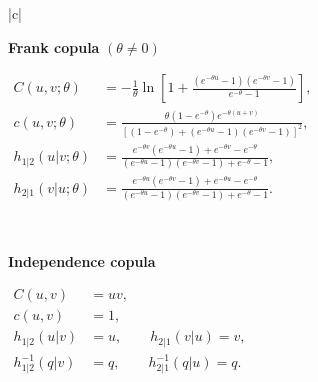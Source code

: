 \documentclass[12pt,oneside,a4paper]{book}
\theoremstyle{definition}
\theoremstyle{remark}
\begin{document}
\begin{table}[H]
\begin{tabular}{|c|}
				\\
				\hline


				\textbf{Frank copula}
				$\left(\theta\neq0\right)$
				\\
				\hline

				\(\begin{aligned}
					C(u,v;\theta)
					&=
					-\frac{1}{\theta}
					\ln\left[
					1+
					\frac{
						(e^{-\theta u}-1)
						(e^{-\theta v}-1)
					}{
						e^{-\theta}-1
					}
					\right],\\[2pt]
					c(u,v;\theta)
					&=
					\frac{
						\theta(1-e^{-\theta})
						e^{-\theta(u+v)}
					}{
						\left[
						(1-e^{-\theta})
						+
						(e^{-\theta u}-1)
						(e^{-\theta v}-1)
						\right]^2
					},\\[2pt]
					h_{1|2}(u|v;\theta)
					&=
					\frac{
						e^{-\theta v}
						(e^{-\theta u}-1)
						+
						e^{-\theta v}
						-
						e^{-\theta}
					}{
						(e^{-\theta u}-1)
						(e^{-\theta v}-1)
						+
						e^{-\theta}-1
					},\\[2pt]
					h_{2|1}(v|u;\theta)
					&=
					\frac{
						e^{-\theta u}
						(e^{-\theta v}-1)
						+
						e^{-\theta u}
						-
						e^{-\theta}
					}{
						(e^{-\theta u}-1)
						(e^{-\theta v}-1)
						+
						e^{-\theta}-1
					}.
				\end{aligned}\)

				\\
				\hline


				\textbf{Independence copula}
				\\
				\hline

				\(\begin{aligned}
					C(u,v)
					&=uv,\\
					c(u,v)
					&=1,\\
					h_{1|2}(u|v)
					&=u,\qquad
					h_{2|1}(v|u)=v,\\
					h^{-1}_{1|2}(q|v)
					&=q,\qquad
					h^{-1}_{2|1}(q|u)=q.
				\end{aligned}\)

				\\
				\hline

			\end{tabular}
			\caption{Bivariate copula families, corresponding copula densities, $h$-functions, and inverse $h$-functions.}
			\label{tab:copula_definitions}
		\end{table}
\end{document}
